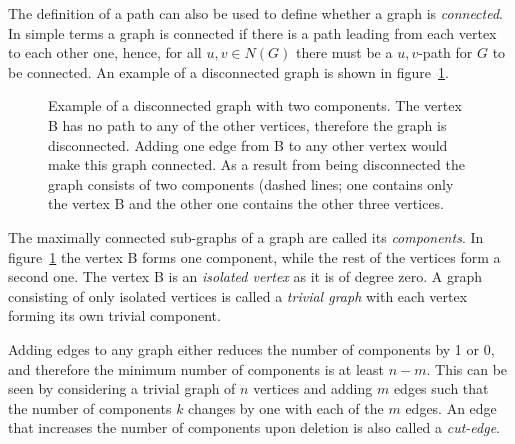 The definition of a path can also be used to define whether a graph is
\emph{connected}. In simple terms a graph is connected if there is a path
leading from each vertex to each other one, hence, for all $u,v\in N(G)$ there
must be a $u,v$-path for $G$ to be connected. An example of a disconnected graph
is shown in figure~\ref{fig:disconnectedgraph}.
%
\begin{figure}[htb]
    \centering
    \caption{Example of a disconnected graph with two components. The vertex B
    has no path to any of the other vertices, therefore the graph is
    disconnected. Adding one edge from B to any other vertex would make this
    graph connected. As a result from being disconnected the graph consists of
    two components (dashed lines; one contains only the vertex B and the other
    one contains the other three vertices.} \label{fig:disconnectedgraph}
\end{figure}
%
The maximally connected sub-graphs of a graph are called its
\textit{components}. In figure~\ref{fig:disconnectedgraph} the vertex B forms
one component, while the rest of the vertices form a second one. The vertex B is
an \textit{isolated vertex} as it is of degree zero. A graph consisting of only
isolated vertices is called a \textit{trivial graph} with each vertex forming
its own trivial component.

Adding edges to any graph either reduces the number of components by 1 or 0,
and therefore the minimum number of components is at least $n-m$. This can be
seen by considering a trivial graph of $n$ vertices and adding $m$ edges such
that the number of components $k$ changes by one with each of the $m$ edges. An
edge that increases the number of components upon deletion is also called a
\textit{cut-edge}.

